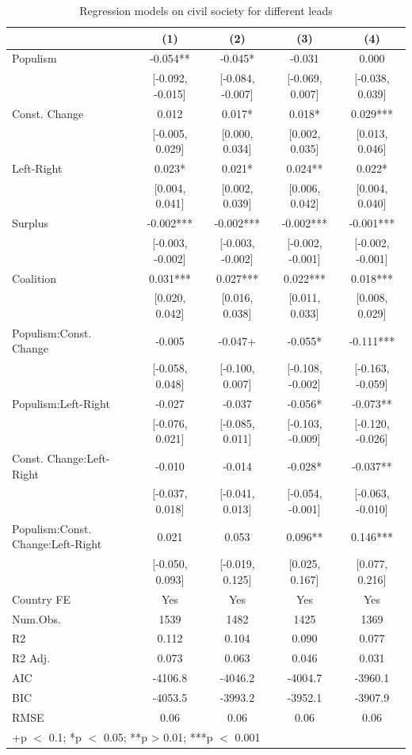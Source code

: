 \documentclass[
  abstract]{article}
\begin{document}
\hypertarget{tbl-leadcspart}{}
\begin{table}
\caption{\label{tbl-leadcspart}Regression models on civil society for different leads }\tabularnewline

\centering\centering\centering
\begin{tabular}[t]{lcccc}
\toprule
  & (1) & (2) & (3) & (4)\\
\midrule
Populism & -0.054** & -0.045* & -0.031 & 0.000\\
 & {}[-0.092, -0.015] & {}[-0.084, -0.007] & {}[-0.069, 0.007] & {}[-0.038, 0.039]\\
Const. Change & 0.012 & 0.017* & 0.018* & 0.029***\\
 & {}[-0.005, 0.029] & {}[0.000, 0.034] & {}[0.002, 0.035] & {}[0.013, 0.046]\\
Left-Right & 0.023* & 0.021* & 0.024** & 0.022*\\
 & {}[0.004, 0.041] & {}[0.002, 0.039] & {}[0.006, 0.042] & {}[0.004, 0.040]\\
Surplus & -0.002*** & -0.002*** & -0.002*** & -0.001***\\
 & {}[-0.003, -0.002] & {}[-0.003, -0.002] & {}[-0.002, -0.001] & {}[-0.002, -0.001]\\
Coalition & 0.031*** & 0.027*** & 0.022*** & 0.018***\\
 & {}[0.020, 0.042] & {}[0.016, 0.038] & {}[0.011, 0.033] & {}[0.008, 0.029]\\
Populism:Const. Change & -0.005 & -0.047+ & -0.055* & -0.111***\\
 & {}[-0.058, 0.048] & {}[-0.100, 0.007] & {}[-0.108, -0.002] & {}[-0.163, -0.059]\\
Populism:Left-Right & -0.027 & -0.037 & -0.056* & -0.073**\\
 & {}[-0.076, 0.021] & {}[-0.085, 0.011] & {}[-0.103, -0.009] & {}[-0.120, -0.026]\\
Const. Change:Left-Right & -0.010 & -0.014 & -0.028* & -0.037**\\
 & {}[-0.037, 0.018] & {}[-0.041, 0.013] & {}[-0.054, -0.001] & {}[-0.063, -0.010]\\
Populism:Const. Change:Left-Right & 0.021 & 0.053 & 0.096** & 0.146***\\
 & {}[-0.050, 0.093] & {}[-0.019, 0.125] & {}[0.025, 0.167] & {}[0.077, 0.216]\\
\midrule
Country FE & Yes & Yes & Yes & Yes\\
Num.Obs. & 1539 & 1482 & 1425 & 1369\\
R2 & 0.112 & 0.104 & 0.090 & 0.077\\
R2 Adj. & 0.073 & 0.063 & 0.046 & 0.031\\
AIC & -4106.8 & -4046.2 & -4004.7 & -3960.1\\
BIC & -4053.5 & -3993.2 & -3952.1 & -3907.9\\
RMSE & 0.06 & 0.06 & 0.06 & 0.06\\
\bottomrule
\multicolumn{5}{l}{\rule{0pt}{1em}+p $<$ 0.1; *p $<$ 0.05; **p > 0.01; ***p $<$ 0.001}\\
\end{tabular}
\end{table}
\end{document}
